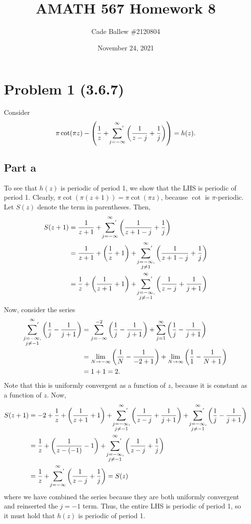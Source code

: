 \documentclass{article}
\title{AMATH 567 Homework 8}
\author{Cade Ballew \#2120804}
\date{November 24, 2021}
\begin{document}
\maketitle

\section{Problem 1 (3.6.7)}
Consider \[
    \pi \cot(\pi z) - \left(\frac{1}{z} + \sideset{}{^{'}}\sum_{j = -\infty}^{\infty} \left(\frac{1}{z - j} + \frac{1}{j}\right)\right) = h(z).
    \]

\subsection{Part a}
To see that $h(z)$ is periodic of period 1, we show that the LHS is periodic of period 1. Clearly, $\pi \cot(\pi (z+1))=\pi \cot(\pi z)$, because $\cot$ is $\pi$-periodic. Let $S(z)$ denote the term in parentheses. Then,
\begin{align*}
S(z+1)&=\frac{1}{z+1}+\sideset{}{^{'}}\sum_{j = -\infty}^{\infty} \left(\frac{1}{z+1 - j} + \frac{1}{j}\right)\\&=\frac{1}{z+1}+\left(\frac{1}{z}+1\right)+\sideset{}{^{'}}\sum_{\substack{j = -\infty,\\j\neq1}}^{\infty} \left(\frac{1}{z +1- j} + \frac{1}{j}\right)\\&=
\frac{1}{z}+\left(\frac{1}{z+1}+1\right)+\sideset{}{^{'}}\sum_{\substack{j = -\infty,\\j\neq-1}}^{\infty} \left(\frac{1}{z - j} + \frac{1}{j+1}\right)
\end{align*}
Now, consider the series 
\begin{align*}
\sideset{}{^{'}}\sum_{\substack{j = -\infty,\\j\neq-1}}^{\infty} \left(\frac{1}{j} - \frac{1}{j+1}\right)&=\sum_{j=-\infty}^{-2}\left(\frac{1}{j} - \frac{1}{j+1}\right)+\sum_{j=1}^{\infty}\left(\frac{1}{j} - \frac{1}{j+1}\right)\\&=
\lim_{N\to-\infty}\left(\frac{1}{N} - \frac{1}{-2+1}\right)+\lim_{N\to\infty}\left(\frac{1}{1} - \frac{1}{N+1}\right)\\&=
1+1=2.
\end{align*}
Note that this is uniformly convergent as a function of $z$, because it is constant as a function of $z$. Now,
\begin{align*}
S(z+1)&=-2+\frac{1}{z}+\left(\frac{1}{z+1}+1\right)+\sideset{}{^{'}}\sum_{\substack{j = -\infty,\\j\neq-1}}^{\infty} \left(\frac{1}{z - j} + \frac{1}{j+1}\right)+\sideset{}{^{'}}\sum_{\substack{j = -\infty,\\j\neq-1}}^{\infty} \left(\frac{1}{j} - \frac{1}{j+1}\right)\\&=
\frac{1}{z}+\left(\frac{1}{z-(-1)}-1\right)+\sideset{}{^{'}}\sum_{\substack{j = -\infty,\\j\neq-1}}^{\infty} \left(\frac{1}{z - j} + \frac{1}{j}\right)\\&=
\frac{1}{z}+\sideset{}{^{'}}\sum_{j = -\infty}^{\infty} \left(\frac{1}{z - j} + \frac{1}{j}\right)=S(z)
\end{align*}
where we have combined the series because they are both uniformly convergent and reinserted the $j=-1$ term. Thus, the entire LHS is periodic of period 1, so it must hold that $h(z)$ is periodic of period 1. 
\end{document}
